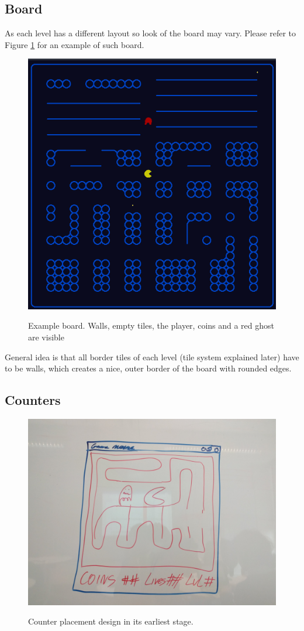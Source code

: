 \documentclass[11pt,a4paper,notitlepage]{report}
\newcommand{\dsubsection}[1]{\FloatBarrier \subsection{#1}}
\newenvironment{img}{
	\begin{center}
		\begin{figure}[H]
			\begin{center}
			
}{
	\end{center}
		\end{figure}
			\end{center}
}
\begin{document}
			\dsubsection{Board}
				As each level has a different layout so look of the board may vary. Please refer to Figure \ref{example_board} for an example of such board.
				\begin{img}
					\includegraphics[width=350pt]{images/board_example}\\
					\caption{Example board. Walls, empty tiles, the player, coins and a red ghost are visible}
					\label{example_board}
				\end{img}
				General idea is that all border tiles of each level (tile system explained later) have to be walls, which creates a nice, outer border of the board with rounded edges.
			\dsubsection{Counters}
				\begin{img}
					\includegraphics[width=350pt]{images/counters_whiteboard.jpg}\\
					\caption{Counter placement design in its earliest stage.}
				\end{img}
\end{document}
